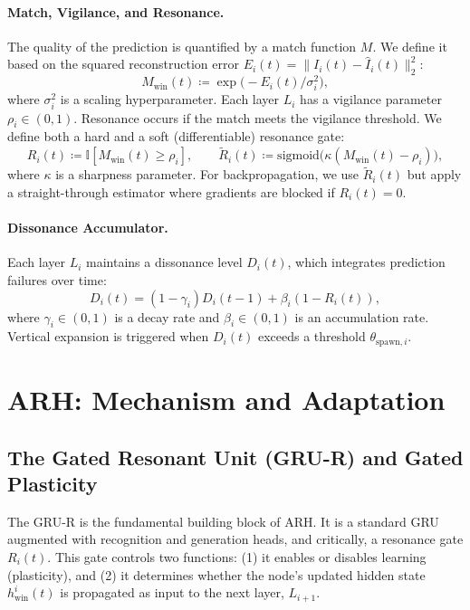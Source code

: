 \documentclass{article}
\begin{document}
\paragraph{Match, Vigilance, and Resonance.} The quality of the prediction is quantified by a match function $M$. We define it based on the squared reconstruction error $E_i(t) = \|I_i(t) - \hat{I}_i(t)\|_2^2$:
\begin{equation}
    M_{\text{win}}(t) \coloneqq \exp\big(-E_i(t) / \sigma_i^2\big),
\end{equation}
where $\sigma_i^2$ is a scaling hyperparameter. Each layer $L_i$ has a vigilance parameter $\rho_i \in (0, 1)$. Resonance occurs if the match meets the vigilance threshold. We define both a hard and a soft (differentiable) resonance gate:
\begin{equation}
    R_i(t) \coloneqq \mathbb{I}[M_{\text{win}}(t) \ge \rho_i], \qquad
    \tilde{R}_i(t) \coloneqq \text{sigmoid}\big(\kappa(M_{\text{win}}(t) - \rho_i)\big),
\end{equation}
where $\kappa$ is a sharpness parameter. For backpropagation, we use $\tilde{R}_i(t)$ but apply a straight-through estimator where gradients are blocked if $R_i(t) = 0$.

\paragraph{Dissonance Accumulator.} Each layer $L_i$ maintains a dissonance level $D_i(t)$, which integrates prediction failures over time:
\begin{equation}
    D_i(t) = (1 - \gamma_i) D_i(t-1) + \beta_i (1 - R_i(t)),
    \label{eq:dissonance}
\end{equation}
where $\gamma_i \in (0,1)$ is a decay rate and $\beta_i \in (0,1)$ is an accumulation rate. Vertical expansion is triggered when $D_i(t)$ exceeds a threshold $\theta_{\text{spawn},i}$.

\section{ARH: Mechanism and Adaptation}

\subsection{The Gated Resonant Unit (GRU-R) and Gated Plasticity}
The GRU-R is the fundamental building block of ARH. It is a standard GRU \citep{gru2014} augmented with recognition and generation heads, and critically, a resonance gate $R_i(t)$. This gate controls two functions: (1) it enables or disables learning (plasticity), and (2) it determines whether the node's updated hidden state $h_{\text{win}}^i(t)$ is propagated as input to the next layer, $L_{i+1}$.
\end{document}
